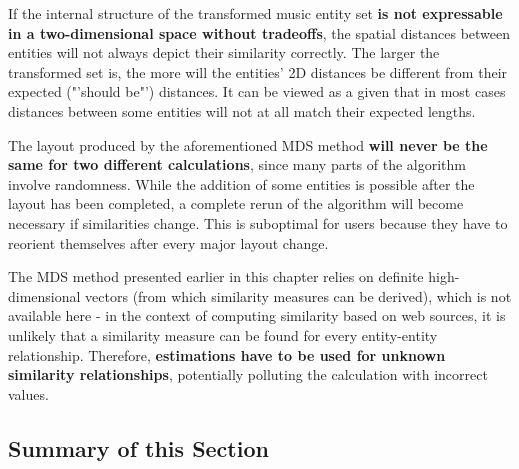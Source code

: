 If the internal structure of the transformed music entity set \textbf{is not expressable in a two-dimensional space without tradeoffs}, the spatial distances between entities will not always depict their similarity correctly. The larger the transformed set is, the more will the entities' 2D distances be different from their expected ("'should be"') distances. It can be viewed as a given that in most cases distances between some entities will not at all match their expected lengths.

The layout produced by the aforementioned MDS method \textbf{will never be the same for two different calculations}, since many parts of the algorithm involve randomness. While the addition of some entities is possible after the layout has been completed, a complete rerun of the algorithm will become necessary if similarities change. This is suboptimal for users because they have to reorient themselves after every major layout change.

The MDS method presented earlier in this chapter relies on definite high-dimensional vectors (from which similarity measures can be derived), which is not available here - in the context of computing similarity based on web sources, it is unlikely that a similarity measure can be found for every entity-entity relationship. Therefore, \textbf{estimations have to be used for unknown similarity relationships}, potentially polluting the calculation with incorrect values.

\subsection{Summary of this Section}